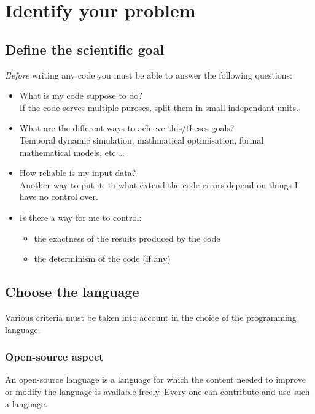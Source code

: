 \documentclass[11pt]{article}
\begin{document}
	\section{Identify your problem}
		\label{sec:cerner}

		\subsection{Define the scientific goal}
			\emph{Before} writing any code you must be able to answer the following questions:
			\begin{itemize}
				\item What is my code suppose to do? \\
				If the code serves multiple puroses, split them in small independant units.
				\item What are the different ways to achieve this/theses goals? \\
				Temporal dynamic simulation, mathmatical optimisation, formal mathematical models, etc \ldots

				\item How reliable is my input data? \\
				Another way to put it: to what extend the code errors depend on things I have no control over.
				\item Is there a way for me to control:
				\begin{itemize}
					\item the exactness of the results produced by the code
					\item the determinism of the code (if any)
				\end{itemize}
			\end{itemize}

		\subsection{Choose the language}
			Various criteria must be taken into account in the choice of the programming language.

			\subsubsection{Open-source aspect}
				An open-source language is a language for which the content needed to improve or modify the language is available freely. Every one can contribute and use such a language.
\end{document}
